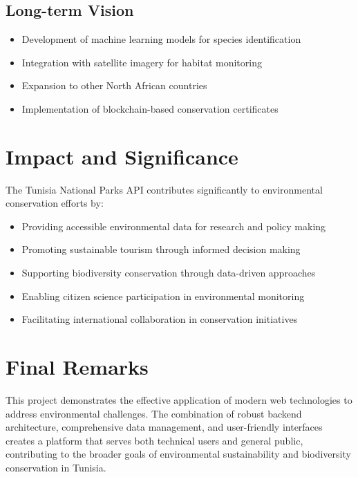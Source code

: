 \documentclass[12pt,a4paper]{report}
\begin{document}
\subsection{Long-term Vision}
\begin{itemize}
    \item Development of machine learning models for species identification
    \item Integration with satellite imagery for habitat monitoring
    \item Expansion to other North African countries
    \item Implementation of blockchain-based conservation certificates
\end{itemize}

\section{Impact and Significance}

The Tunisia National Parks API contributes significantly to environmental conservation efforts by:

\begin{itemize}
    \item Providing accessible environmental data for research and policy making
    \item Promoting sustainable tourism through informed decision making
    \item Supporting biodiversity conservation through data-driven approaches
    \item Enabling citizen science participation in environmental monitoring
    \item Facilitating international collaboration in conservation initiatives
\end{itemize}

\section{Final Remarks}

This project demonstrates the effective application of modern web technologies to address environmental challenges. The combination of robust backend architecture, comprehensive data management, and user-friendly interfaces creates a platform that serves both technical users and general public, contributing to the broader goals of environmental sustainability and biodiversity conservation in Tunisia.
\end{document}
